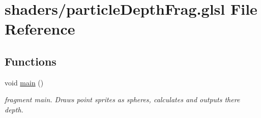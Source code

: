\hypertarget{particle_depth_frag_8glsl}{\section{shaders/particle\-Depth\-Frag.glsl File Reference}
\label{particle_depth_frag_8glsl}
}
\subsection*{Functions}
\begin{DoxyCompactItemize}
\item 
\hypertarget{particle_depth_frag_8glsl_acdef7a1fd863a6d3770c1268cb06add3}{void \hyperlink{particle_depth_frag_8glsl_acdef7a1fd863a6d3770c1268cb06add3}{main} ()}\label{particle_depth_frag_8glsl_acdef7a1fd863a6d3770c1268cb06add3}

\begin{DoxyCompactList}\small\item\em fragment main. Draws point sprites as spheres, calculates and outputs there depth. \end{DoxyCompactList}\end{DoxyCompactItemize}

